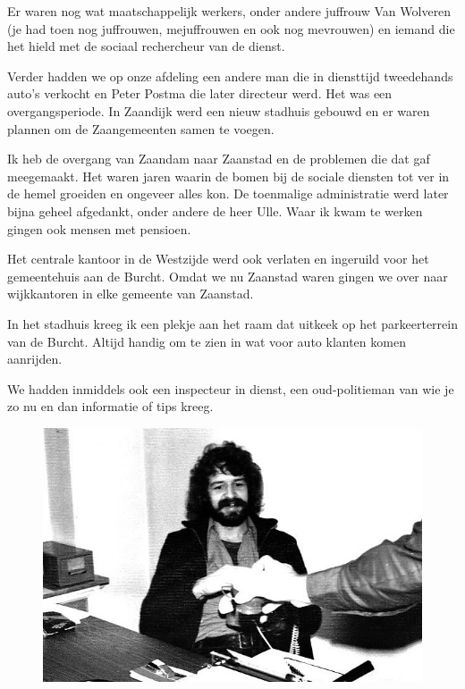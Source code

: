 \documentclass[10pt,twoside, openright]{memoir}
\begin{document}
Er waren nog wat maatschappelijk werkers, onder andere juffrouw Van Wolveren (je had toen nog juffrouwen, mejuffrouwen en ook nog mevrouwen) en iemand die het hield met de sociaal rechercheur van de dienst. 

Verder hadden we op onze afdeling een andere man die in diensttijd tweedehands auto’s verkocht en Peter Postma die later directeur werd. Het was een overgangsperiode. In Zaandijk werd een nieuw stadhuis gebouwd en er waren plannen om de Zaangemeenten samen te voegen.

Ik heb de overgang van Zaandam naar Zaanstad en de problemen die dat gaf meegemaakt. Het waren jaren waarin de bomen bij de sociale diensten tot ver in de hemel groeiden en ongeveer alles kon. De toenmalige administratie werd later bijna geheel afgedankt, onder andere de heer Ulle. Waar ik kwam te werken gingen ook mensen met pensioen.

Het centrale kantoor in de Westzijde werd ook verlaten en ingeruild voor het gemeentehuis aan de Burcht. Omdat we nu Zaanstad waren gingen we over naar wijkkantoren in elke gemeente van Zaanstad. 

In het stadhuis kreeg ik een plekje aan het raam dat uitkeek op het parkeerterrein van de Burcht. Altijd handig om te zien in wat voor auto klanten komen aanrijden. 

We hadden inmiddels ook een inspecteur in dienst, een oud-politieman van wie je zo nu en dan informatie of tips kreeg. 


\begin{figure}
\includegraphics[width=\textwidth]{img/ch42/IMG_0001}
\end{figure}
\end{document}
